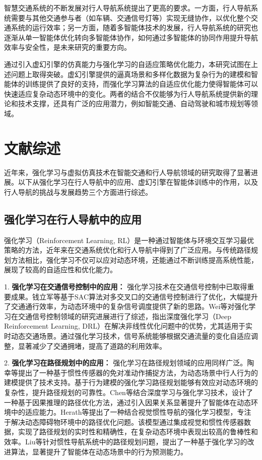 智慧交通系统的不断发展对行人导航系统提出了更高的要求。一方面，行人导航系统需要与其他交通参与者（如车辆、交通信号灯等）实现无缝协作，以优化整个交通系统的运行效率；另一方面，随着多智能体技术的发展，行人导航系统的研究也逐渐从单一智能体优化转向多智能体协作，如何通过多智能体的协同作用提升导航效率与安全性，是未来研究的重要方向。

通过引入虚幻引擎的仿真能力与强化学习的自适应策略优化能力，本研究试图在上述问题上取得突破。虚幻引擎提供的逼真场景和多样化数据为复杂行为的建模和智能体的训练提供了良好的支持，而强化学习算法的自适应优化能力使得智能体可以快速适应复杂动态环境中的变化。两者的结合不仅能够为行人导航系统提供新的理论和技术支撑，还具有广泛的应用潜力，例如智能交通、自动驾驶和城市规划等领域。

\section*{文献综述}

近年来，强化学习与虚拟仿真技术在智能交通和行人导航领域的研究取得了显著进展。以下从强化学习在行人导航中的应用、虚幻引擎在智能体训练中的作用，以及行人导航的挑战与发展趋势三个方面进行综述。

\subsection*{强化学习在行人导航中的应用}

强化学习（Reinforcement Learning, RL）是一种通过智能体与环境交互学习最优策略的方法，近年来在交通系统优化和行人导航中得到了广泛应用。与传统路径规划方法相比，强化学习不仅可以应对动态环境，还能通过不断训练提高系统性能，展现了较高的自适应性和优化能力。

1. \textbf{强化学习在交通信号控制中的应用：} 强化学习技术在交通信号控制中已取得重要成果。钱立军等\cite{qian2024sac}基于SAC算法对多交叉口的交通信号控制进行了优化，大幅提升了交通通行效率，为动态环境中的复杂信号调度提供了新的思路。Wei等\cite{wei2021survey}对强化学习在交通信号控制领域的研究进展进行了综述，指出深度强化学习（Deep Reinforcement Learning, DRL）在解决非线性优化问题中的优势，尤其适用于实时动态交通场景。通过强化学习技术，信号系统能够根据交通流量的变化自适应调整，显著减少了交通拥堵，提高了道路的利用效率。

2. \textbf{强化学习在路径规划中的应用：} 强化学习在路径规划领域的应用同样广泛。陶幸等\cite{tao2024motion}提出了一种基于惯性传感器的免对准动作捕捉方法，为动态场景中行人行为的建模提供了技术支持。基于行为建模的强化学习路径规划能够有效应对动态环境的复杂性，提升路径规划的可靠性。Chen等\cite{chen2018ionet}结合深度学习与强化学习技术，设计了一种基于因果推理的路径优化方法，通过引入因果关系显著提升了智能体在动态环境中的适应能力。Herath等\cite{herath2020ronin}提出了一种结合视觉惯性导航的强化学习模型，专注于解决动态障碍物环境中的路径优化问题。该模型通过集成视觉和惯性传感器数据，实现了路径规划的实时性和精确性，在复杂动态环境中表现出较高的鲁棒性和效率。Liu等\cite{liu2020tlio}针对惯性导航系统中的路径规划问题，提出了一种基于强化学习的改进算法，显著提升了智能体在动态场景中的行为预测能力。

